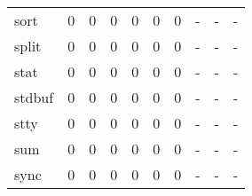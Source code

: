 \begin{longtable}{lp{1.3cm}p{1.3cm}p{1.3cm}p{1.3cm}p{1.3cm}p{1.3cm}p{1.3cm}p{1.3cm}p{1.3cm}}
sort      &                      0 &                                             0 &                                            0 &                                           0 &                                            0 &                                          0 &                                    - &                                      - &                                    - \\
split     &                      0 &                                             0 &                                            0 &                                           0 &                                            0 &                                          0 &                                    - &                                      - &                                    - \\
stat      &                      0 &                                             0 &                                            0 &                                           0 &                                            0 &                                          0 &                                    - &                                      - &                                    - \\
stdbuf    &                      0 &                                             0 &                                            0 &                                           0 &                                            0 &                                          0 &                                    - &                                      - &                                    - \\
stty      &                      0 &                                             0 &                                            0 &                                           0 &                                            0 &                                          0 &                                    - &                                      - &                                    - \\
sum       &                      0 &                                             0 &                                            0 &                                           0 &                                            0 &                                          0 &                                    - &                                      - &                                    - \\
sync      &                      0 &                                             0 &                                            0 &                                           0 &                                            0 &                                          0 &                                    - &                                      - &                                    - \\

\end{longtable}
